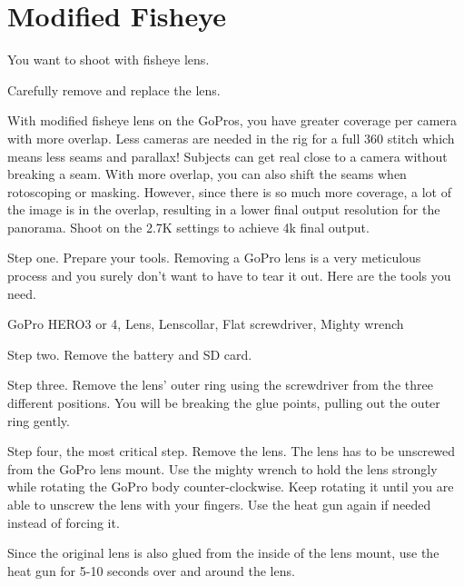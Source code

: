 \chapter{Modified Fisheye}
\pagecolor{white}
\label{chap:26}
\begin{fullwidth}

\problem

{\large You want to shoot with fisheye lens. \par}


\solution

{\large Carefully remove and replace the lens. \par}

With modified fisheye lens on the GoPros, you have greater coverage per camera with more overlap. Less cameras are needed in the rig for a full 360 stitch which means less seams and parallax! Subjects can get real close to a camera without breaking a seam. With more overlap, you can also shift the seams when rotoscoping or masking. However, since there is so much more coverage, a lot of the image is in the overlap, resulting in a lower final output resolution for the panorama. Shoot on the 2.7K settings to achieve 4k final output. 


Step one. Prepare your tools. Removing a GoPro lens is a very meticulous process and you surely don't want to have to tear it out. Here are the tools you need. 

GoPro HERO3 or 4, Lens, Lenscollar, Flat screwdriver, Mighty wrench


Step two. Remove the battery and SD card.


Step three. Remove the lens' outer ring using the screwdriver from the three different positions. You will be breaking the glue points, pulling out the outer ring gently.


Step four, the most critical step. Remove the lens. The lens has to be unscrewed from the GoPro lens mount. Use the mighty wrench to hold the lens strongly while rotating the GoPro body counter-clockwise. Keep rotating it until you are able to unscrew the lens with your fingers. Use the heat gun again if needed instead of forcing it.


\tip Since the original lens is also glued from the inside of the lens mount, use the heat gun for 5-10 seconds over and around the lens. 


\end{fullwidth}

